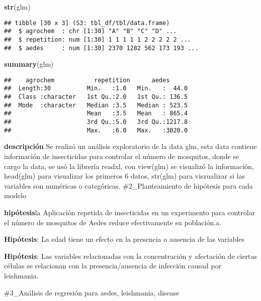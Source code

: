 \documentclass[
]{article}
\newenvironment{Shaded}{\begin{snugshade}}{\end{snugshade}}
\newcommand{\FunctionTok}[1]{\textcolor[rgb]{0.13,0.29,0.53}{\textbf{#1}}}
\newcommand{\NormalTok}[1]{#1}
\begin{document}
\begin{Shaded}
\begin{Highlighting}[]
\FunctionTok{str}\NormalTok{(glm)}
\end{Highlighting}
\end{Shaded}

\begin{verbatim}
## tibble [30 x 3] (S3: tbl_df/tbl/data.frame)
##  $ agrochem  : chr [1:30] "A" "B" "C" "D" ...
##  $ repetition: num [1:30] 1 1 1 1 1 2 2 2 2 2 ...
##  $ aedes     : num [1:30] 2370 1282 562 173 193 ...
\end{verbatim}

\begin{Shaded}
\begin{Highlighting}[]
\FunctionTok{summary}\NormalTok{(glm)}
\end{Highlighting}
\end{Shaded}

\begin{verbatim}
##    agrochem           repetition      aedes       
##  Length:30          Min.   :1.0   Min.   :  44.0  
##  Class :character   1st Qu.:2.0   1st Qu.: 136.5  
##  Mode  :character   Median :3.5   Median : 523.5  
##                     Mean   :3.5   Mean   : 865.4  
##                     3rd Qu.:5.0   3rd Qu.:1217.8  
##                     Max.   :6.0   Max.   :3020.0
\end{verbatim}

\textbf{descripción} Se realizó un análisis exploratorio de la data glm,
esta data contiene información de insecticidas para controlar el número
de mosquitos, donde se cargo la data, se usó la librería readxl, con
view(glm) se visualizó la información, head(glm) para visualizar los
primeros 6 datos, str(glm) para viszualizar si las variables son
numéricas o categóricas. \#2\_Planteamiento de hipótesis para cada
modelo

\textbf{hipótesis}la Aplicación repetida de insecticidas en un
experimento para controlar el número de mosquitos de Aedes reduce
efectivamente su población.a.

\textbf{Hipótesis}: La edad tiene un efecto en la presencia o ausencia
de las variables

\textbf{Hipótesis}: Las variables relacionadas con la concentración y
afectación de ciertas células se relacionan con la presencia/ausencia de
infección causad por leishmania.

\#3\_Análisis de regresión para aedes, leishmania, disease
\end{document}
